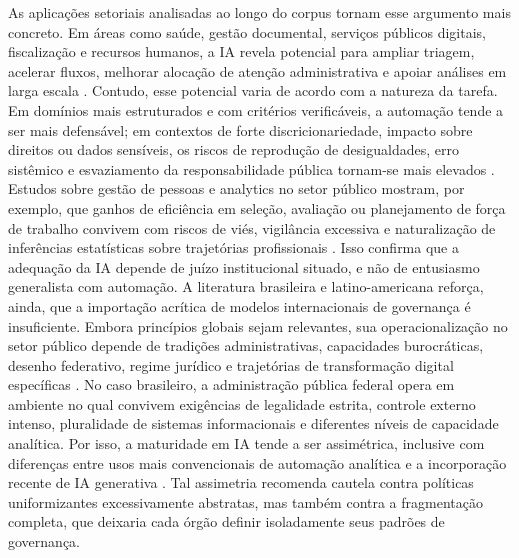 \documentclass[12pt,a4paper]{article}
\begin{document}
As aplicações setoriais analisadas ao longo do corpus tornam esse argumento mais concreto. Em áreas como saúde, gestão documental, serviços públicos digitais, fiscalização e recursos humanos, a IA revela potencial para ampliar triagem, acelerar fluxos, melhorar alocação de atenção administrativa e apoiar análises em larga escala \autocite{lemes2020o} \autocite{alhosani2024opportunities} \autocite{lyrio2025emerging}. Contudo, esse potencial varia de acordo com a natureza da tarefa. Em domínios mais estruturados e com critérios verificáveis, a automação tende a ser mais defensável; em contextos de forte discricionariedade, impacto sobre direitos ou dados sensíveis, os riscos de reprodução de desigualdades, erro sistêmico e esvaziamento da responsabilidade pública tornam-se mais elevados \autocite{pi2021machine} \autocite{krtner2021predictive}. Estudos sobre gestão de pessoas e analytics no setor público mostram, por exemplo, que ganhos de eficiência em seleção, avaliação ou planejamento de força de trabalho convivem com riscos de viés, vigilância excessiva e naturalização de inferências estatísticas sobre trajetórias profissionais \autocite{cho2023human} \autocite{chilunjika2022artificial} \autocite{barros2025inteligencia}. Isso confirma que a adequação da IA depende de juízo institucional situado, e não de entusiasmo generalista com automação.
A literatura brasileira e latino-americana reforça, ainda, que a importação acrítica de modelos internacionais de governança é insuficiente. Embora princípios globais sejam relevantes, sua operacionalização no setor público depende de tradições administrativas, capacidades burocráticas, desenho federativo, regime jurídico e trajetórias de transformação digital específicas \autocite{criado2024inteligencia} \autocite{serra2024a} \autocite{goulart2025processos}. No caso brasileiro, a administração pública federal opera em ambiente no qual convivem exigências de legalidade estrita, controle externo intenso, pluralidade de sistemas informacionais e diferentes níveis de capacidade analítica. Por isso, a maturidade em IA tende a ser assimétrica, inclusive com diferenças entre usos mais convencionais de automação analítica e a incorporação recente de IA generativa \autocite{mariano2026inteligencia}. Tal assimetria recomenda cautela contra políticas uniformizantes excessivamente abstratas, mas também contra a fragmentação completa, que deixaria cada órgão definir isoladamente seus padrões de governança.
\end{document}
